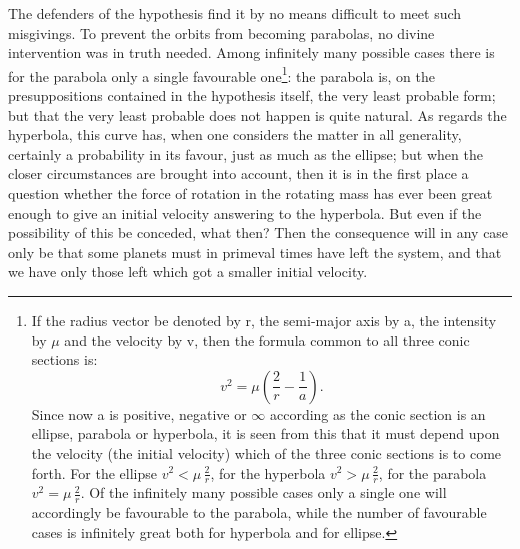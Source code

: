 \documentclass[12pt,a4paper]{book}
\begin{document}
The defenders of the hypothesis find it by no means difficult to meet such misgivings. To prevent the orbits
from becoming parabolas, no divine
intervention was in truth needed. Among infinitely many possible cases there is for the parabola only a
single
favourable one\footnote{%
If the radius vector be denoted by r, the semi-major axis by a, the intensity by $\mu$ and the velocity by
v, then the formula common to all three conic sections is:
\[ v^2 = \mu\left(\frac{2}{r} - \frac{1}{a}\right). \]
Since now a is positive, negative or $\infty$ according as the conic section is an ellipse, parabola or
hyperbola, it is seen from this that it must depend upon the velocity (the initial velocity) which of the
three conic sections is to come forth. For the ellipse $v^2 < \mu\,\frac{2}{r}$, for the hyperbola
$v^2 > \mu\,\frac{2}{r}$, for the parabola $v^2 = \mu\,\frac{2}{r}$. Of the infinitely many possible cases
only a single one will accordingly be favourable to the parabola, while the number of favourable cases is
infinitely great both for hyperbola and for ellipse.}:
the parabola is, on the presuppositions contained in the hypothesis itself, the very least probable form;
but that the very least probable does not happen is quite natural. As regards the hyperbola, this curve
has, when one considers the matter in all generality, certainly a probability in its favour, just as much
as the ellipse; but when the closer circumstances are brought into account, then it is in the first place a
question whether the force of rotation in the rotating mass has ever been great enough to give an initial
velocity answering to the hyperbola. But even if the possibility of this be conceded, what then? Then the
consequence will in any case only be that some planets must in primeval times have left the system, and
that we have only those left which got a smaller initial velocity.
\end{document}
